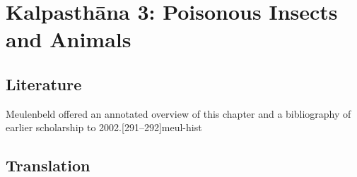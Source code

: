 \chapter{Kalpasthāna 3: Poisonous Insects and Animals}

\section{Literature}

Meulenbeld offered an annotated overview of this chapter and a
bibliography of earlier scholarship to
2002.[291--292]{meul-hist}


\section{Translation}

